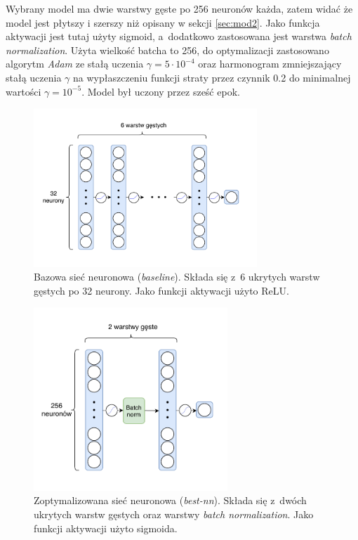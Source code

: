 \documentclass{pracalicmgr}
\begin{document}
	Wybrany model ma dwie warstwy gęste po 256 neuronów każda, zatem widać że model jest płytszy i szerszy niż opisany w sekcji \ref{sec:mod2}. Jako funkcja aktywacji jest tutaj użyty sigmoid, a~dodatkowo zastosowana jest warstwa \textit{batch normalization}. Użyta wielkość batcha to 256, do optymalizacji zastosowano algorytm \textit{Adam} ze stałą uczenia $\gamma = 5\cdot 10^{-4}$ oraz harmonogram zmniejszający stałą uczenia $\gamma$ na wypłaszczeniu funkcji straty przez czynnik 0.2 do minimalnej wartości $\gamma = 10^{-5}$. Model był uczony przez sześć epok.
	
	\begin{figure}[H]
	\centering
	\includegraphics[width=0.75\textwidth]{neural_net.pdf}
	\caption{Bazowa sieć neuronowa (\textit{baseline}). Składa się z~6 ukrytych warstw gęstych po 32 neurony. Jako funkcji aktywacji użyto ReLU.}
	\label{fig:nn1}
	\end{figure}
	
	\begin{figure}[H]
	\centering
	\includegraphics[width=0.65\textwidth]{best_neural_net.pdf}
	\caption{Zoptymalizowana sieć neuronowa (\textit{best-nn}). Składa się z~dwóch ukrytych warstw gęstych oraz warstwy \textit{batch normalization}. Jako funkcji aktywacji użyto sigmoida.}
	\label{fig:nn2}
	\end{figure}
\end{document}
